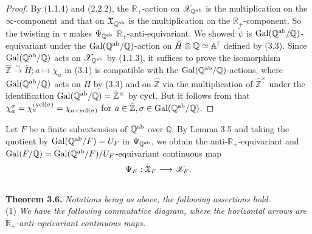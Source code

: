 \documentclass[12pt, leqno]{article}
\begin{document}
\begin{proof}  By (1.1.4) and (2.2.2), the $\mathbb{R}_+$-action on $\mathscr{X}_{\mathbb{Q}^{\rm ab}}$ is the multiplication on the 
$\infty$-component and that on $\frak{X}_{\mathbb{Q}^{\rm ab}}$ is the multiplication on the 
$\mathbb{R}_+$-component. So the twisting in $\tau$ makes $\Psi_{\mathbb{Q}^{\rm ab}}$ $\mathbb{R}_+$-anti-equivariant. 
We showed $\check{\psi}$ is ${\rm Gal}(\mathbb{Q}^{\rm ab}/\mathbb{Q})$-equivariant under the ${\rm Gal}(\mathbb{Q}^{\rm ab}/\mathbb{Q})$-action on $\check{H} \otimes \mathbb{Q} \simeq \mathbb{A}^{\rm f}$ defined by (3.3). Since ${\rm Gal}(\mathbb{Q}^{\rm ab}/\mathbb{Q})$ acts on $\mathscr{X}_{\mathbb{Q}^{\rm ab}}$ by (1.1.3), it suffices to prove
the isomorphism $\hat{\mathbb{Z}} \stackrel{\sim}{\rightarrow} \dot{H}; a \mapsto \chi_a $ in (3.1) is compatible with the ${\rm Gal}(\mathbb{Q}^{\rm ab}/\mathbb{Q})$-actions,
where ${\rm Gal}(\mathbb{Q}^{\rm ab}/\mathbb{Q})$ acts on $\dot{H}$ by (3.3) and on $\hat{\mathbb{Z}}$ via the multiplication
of $\hat{\mathbb{Z}}^{\times}$ under the identification ${\rm Gal}(\mathbb{Q}^{\rm ab}/\mathbb{Q}) = \hat{\mathbb{Z}}^{\times}$ by ${\rm cycl}$.
But it follows from that $\chi_a^{\sigma} = \chi_a^{{\rm cycl}(\sigma)} = \chi_{a \cdot{\rm cycl}(\sigma)}$ for $a \in \hat{\mathbb{Z}}, \sigma \in {\rm Gal}(\mathbb{Q}^{\rm ab}/\mathbb{Q})$.  \end{proof} 
\par\medskip
\par\noindent
Let $F$ be a finite subextension of $\mathbb{Q}^{\rm ab}$ over $\mathbb{Q}$. By Lemma 3.5 and taking the quotient by ${\rm Gal}(\mathbb{Q}^{\rm ab}/F) = U_F$ in $\Psi_{\mathbb{Q}^{\rm ab}}$, we obtain the anti-$\mathbb{R}_+$-equivariant and ${\rm Gal}(F/\mathbb{Q}) = {\rm Gal}(\mathbb{Q}^{\rm ab}/F) /U_F$-equivariant continuous map
$$ \Psi_{F} : \frak{X}_{F} \longrightarrow \mathscr{X}_{F}. $$
\\
{\bf Theorem 3.6.} {\it Notations being as above, the following assertions hold.}\\
(1) {\it We have the following commutative diagram, where the horizontal arrows are $\mathbb{R}_+$-anti-equivariant continuous maps.}
\begin{center}
\end{center}
\end{document}
